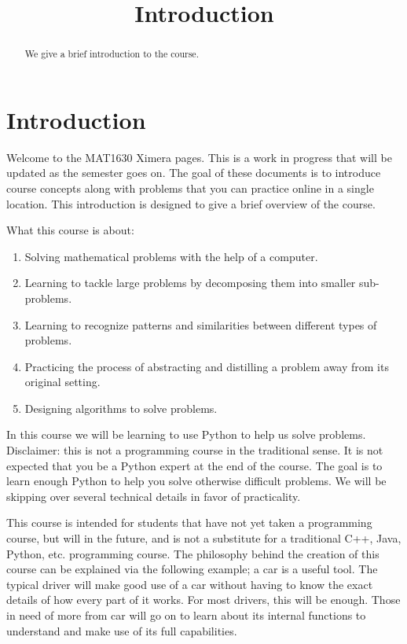 \documentclass{ximera}
\title{Introduction}
\begin{document}
  
\begin{abstract}  
We give a brief introduction to the course.
\end{abstract}  
\maketitle

\section{Introduction}

Welcome to the MAT1630 Ximera pages. This is a work in progress that will be updated as the semester goes on. The goal of these documents is to introduce course concepts along with problems that you can practice online in a single location. 
This introduction is designed to give a brief overview of the course.

What this course is about:

\begin{enumerate}
	\item Solving mathematical problems with the help of a computer.
	\item Learning to tackle large problems by decomposing them into smaller sub-problems.
	\item Learning to recognize patterns and similarities between different types of problems.
	\item Practicing the process of abstracting and distilling a problem away from its original setting.
	\item Designing algorithms to solve problems.
\end{enumerate}

In this course we will be learning to use Python to help us solve problems. Disclaimer: this is not a programming course in the traditional sense. It is not expected that you be a Python expert at the end of the course. The goal is to learn enough Python to help you solve otherwise difficult problems. We will be skipping over several technical details in favor of practicality. 

This course is intended for students that have not yet taken a programming course, but will in the future, and is not a substitute for a traditional C++, Java, Python, etc. programming course. 
The philosophy behind the creation of this course can be explained via the following example; a car is a useful tool. The typical driver will make good use of a car without having to know the exact details of how every part of it works. For most drivers, this will be enough. Those in need of more from car will go on to learn about its internal functions to understand and make use of its full capabilities. 
\end{document}
